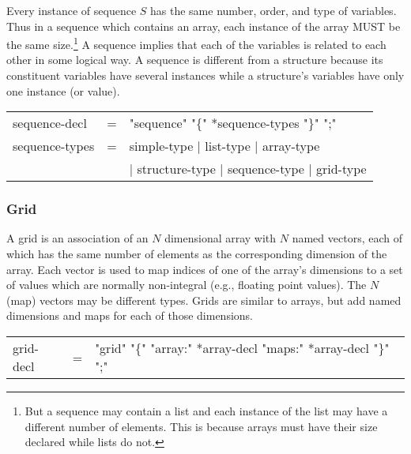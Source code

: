 \noindent Every instance of sequence $S$ has the same number, order, and
type of variables. Thus in a sequence which contains an array, each instance
of the array MUST be the same size.\footnote{But a sequence may contain a
  list and each instance of the list may have a different number of elements.
  This is because arrays must have their size declared while lists do not.} A
sequence implies that each of the variables is related to each other in some
logical way. A sequence is different from a structure because its constituent
variables have several instances while a structure's variables have only one
instance (or value).

\begin{ttfamily}
\begin{center}
\begin{tabular}{lll}
sequence-decl & = & "sequence" "\{" *sequence-types "\}" ";" \\
sequence-types & = & simple-type | list-type | array-type \\
                & & | structure-type | sequence-type | grid-type \\
\end{tabular}
\end{center}
\end{ttfamily}

\subsubsection{Grid}
\label{sec:grid}
 A grid is an association of an $N$ dimensional array with $N$
  named vectors, each of which has the same number of elements as the
  corresponding dimension of the array. Each vector is used to map indices of
  one of the array's dimensions to a set of values which are normally
  non-integral (e.g., floating point values). The $N$ (map) vectors may be
  different types. Grids are similar to arrays, but add named dimensions and
  maps for each of those dimensions.
  \label{page:grids} 

\begin{ttfamily}
\begin{center}
\begin{tabular}{lll}
grid-decl & = & "grid" "\{" "array:" *array-decl "maps:" *array-decl "\}" ";" \\
\end{tabular}
\end{center}
\end{ttfamily}
